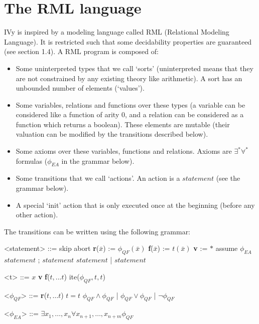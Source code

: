 \documentclass[11pt,a4paper,oldfontcommands,openany]{memoir}
\begin{document}
    \section{The RML language}

    IVy is inspired by a modeling language called RML (Relational Modeling Language). It is restricted such that some decidability properties are guaranteed (see section 1.4).
    A RML program is composed of:
    \begin{itemize}
        \item Some uninterpreted types that we call `sorts' (uninterpreted means that they are not constrained by any existing theory like arithmetic). A sort has an unbounded number of elements (`values').
        \item Some variables, relations and functions over these types (a variable can be considered like a function of arity 0, and a relation can be considered as a function
        which returns a boolean). These elements are mutable (their valuation can be modified by the transitions described below).
        \item Some axioms over these variables, functions and relations. Axioms are \(\exists^*\forall^*\) formulas (\( \phi_{EA} \) in the grammar below).
        \item Some transitions that we call `actions'. An action is a \(statement\) (see the grammar below).
        \item A special `init' action that is only executed once at the beginning (before any other action).
    \end{itemize}

    The transitions can be written using the following grammar:
    \begin{multicols}{2}
        \begin{grammar}

            <statement> ::= skip
            \alt abort
            \alt \textbf{r}(\(\bar{x}\)) := \( \phi_{QF}(\bar{x}) \)
            \alt \textbf{f}(\(\bar{x}\)) := \( t(\bar{x}) \)
            \alt \textbf{v} := \( * \)
            \alt assume \( \phi_{EA} \)
            \alt \( statement \) ; \( statement \)
            \alt \( statement \) | \( statement \)
            
        \end{grammar}

        \columnbreak

        \begin{grammar}

            <t> ::= \(x\)
            \alt \textbf{v}
            \alt \textbf{f}(\(t,...t\))
            \alt ite(\( \phi_{QF},t,t\))

            <\( \phi_{QF} \)> ::= \textbf{r}(\(t,\ldots t\))
            \alt \( t = t \)
            \alt \( \phi_{QF} \land \phi_{QF} \) \quad | \quad \( \phi_{QF} \lor \phi_{QF} \) \quad | \quad \( \neg \phi_{QF} \)
            
            <\( \phi_{EA} \)> ::= \( \exists x_1,\ldots,x_n \forall x_{n+1},\ldots,x_{n+m} \phi_{QF} \)

        \end{grammar}
    \end{multicols}
\end{document}
